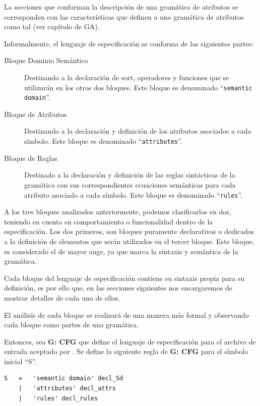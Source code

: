 La secciones que conforman la descripción de una gramática de atributos se corresponden con las características que definen a una gramática de atributos como tal (ver capítulo de GA).
 
Informalmente, el lenguaje de especificación se conforma de las siguientes partes:

\begin{description}
\item [Bloque Dominio Semántico] Destinando a la declaración de sort, operadores y funciones que se utilizarán en los otros dos bloques. Este bloque es denominado ``\texttt{semantic domain}''.
\item [Bloque de Atributos] Destinando a la declaración y definición de los atributos asociados a cada símbolo. Este bloque es denominado ``\texttt{attributes}''.
\item [Bloque de Reglas] Destinado a la declaración y definición de las reglas sintácticas de la gramática con sus correspondientes ecuaciones semánticas para cada atributo asociado a cada símbolo. Este bloque es denominado ``\texttt{rules}''.
\end{description}

A los tres bloques analizados anteriormente, podemos clasificarlos en dos, teniendo en cuenta su comportamiento o funcionalidad dentro de la especificación. Los dos primeros, son bloques puramente declarativos o dedicados a la definición de elementos que serán utilizados en el tercer bloque. Este bloque, es considerado el de mayor auge, ya que marca la sintaxis y semántica de la gramática.

Cada bloque del lenguaje de especificación contiene su sintaxis propia para su definición, es por ello que, en las secciones siguientes nos encargaremos de mostrar detalles de cada uno de ellos.

El análisis de cada bloque se realizará de una manera más formal y observando cada bloque como partes de una gramática.

Entonces, sea \textbf{G: CFG} que define el lenguaje de especificación para el archivo de entrada aceptado por \maggen. Se define la siguiente regla de \textbf{G: CFG} para el símbolo inicial ``S''.

\begin{lstlisting}[frame=shadowbox, rulesepcolor=\color{blue},language=inform, linewidth=10cm ]
S   =   'semantic domain' decl_Sd
    |   'attributes' decl_attrs
    |   'rules' decl_rules
\end{lstlisting}

